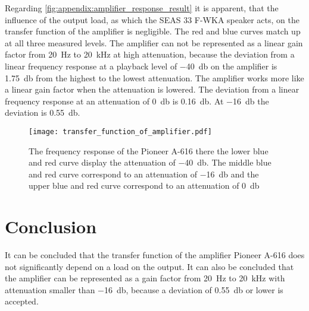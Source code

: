 Regarding \autoref{fig:appendix:amplifier_response_result} it is apparent, that the influence of the output load, as which the SEAS 33 F-WKA speaker acts, on the transfer function of the amplifier is negligible. The red and blue curves match up at all three measured levels. The amplifier can not be represented as a linear gain factor from \SI{20}{\hertz} to \SI{20}{\kilo\hertz} at high attenuation, because the deviation from a linear frequency response at a playback level of \SI{-40}{\decibel} on the amplifier is \SI{1.75}{\decibel} from the highest to the lowest attenuation. The amplifier works more like a linear gain factor when the attenuation is lowered. The deviation from a linear frequency response at an attenuation of \SI{0}{\decibel} is \SI{0.16}{\decibel}. At \SI{-16}{\decibel} the deviation is \SI{0.55}{\decibel}.



\begin{figure}[H]
	\centering
	\texttt{[image: transfer\_function\_of\_amplifier.pdf]}
	\caption{The frequency response of the Pioneer A-616 there the lower blue and red curve display the attenuation of \SI{-40}{\decibel}. The middle blue and red curve correspond to an attenuation of \SI{-16}{\decibel} and the upper blue and red curve correspond to an attenuation of  \SI{0}{\decibel}}
		\label{fig:appendix:amplifier_response_result}
\end{figure}

\section*{Conclusion}
It can be concluded that the transfer function of the amplifier Pioneer A-616 does not significantly depend on a load on the output. It can also be concluded that the amplifier can be represented as a gain factor from \SI{20}{\hertz} to \SI{20}{\kilo\hertz} with attenuation smaller than \SI{-16}{\decibel}, because a deviation of \SI{0.55}{\decibel} or lower is accepted.

